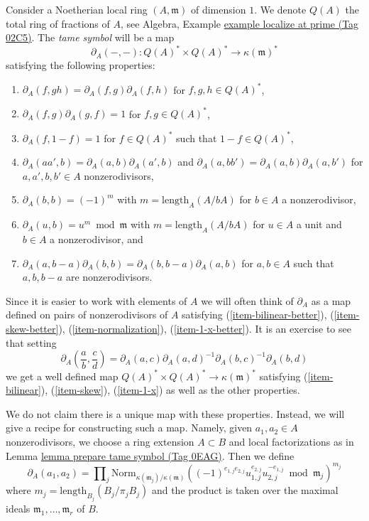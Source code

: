 \documentclass{amsart}
\theoremstyle{plain}
\theoremstyle{definition}
\theoremstyle{remark}
\numberwithin{equation}{subsection}
\begin{document}
\noindent
Consider a Noetherian local ring $(A, \mathfrak m)$ of dimension $1$.
We denote $Q(A)$ the total ring of fractions of $A$, see
Algebra, Example \href{https://stacks.math.columbia.edu/tag/02C5}{example localize at prime (Tag 02C5)}.
The {\it tame symbol} will be a map
$$
\partial_A(-, -) : Q(A)^* \times Q(A)^* \longrightarrow \kappa(\mathfrak m)^*
$$
satisfying the following properties:
\begin{enumerate}
\item $\partial_A(f, gh) = \partial_A(f, g) \partial_A(f, h)$
\label{item-bilinear}
for $f, g, h \in Q(A)^*$,
\item $\partial_A(f, g) \partial_A(g, f) = 1$
\label{item-skew}
for $f, g \in Q(A)^*$,
\item $\partial_A(f, 1 - f) = 1$
\label{item-1-x}
for $f \in Q(A)^*$ such that $1 - f \in Q(A)^*$,
\item $\partial_A(aa', b) = \partial_A(a, b)\partial_A(a', b)$
\label{item-bilinear-better}
and $\partial_A(a, bb') = \partial_A(a, b)\partial_A(a, b')$
for $a, a', b, b' \in A$ nonzerodivisors,
\item $\partial_A(b, b) = (-1)^m$
\label{item-skew-better}
with $m = \text{length}_A(A/bA)$
for $b \in A$ a nonzerodivisor,
\item $\partial_A(u, b) = u^m \bmod \mathfrak m$
\label{item-normalization}
with $m = \text{length}_A(A/bA)$ for $u \in A$ a unit and
$b \in A$ a nonzerodivisor, and
\item
\label{item-1-x-better}
$\partial_A(a, b - a)\partial_A(b, b) = \partial_A(b, b - a)\partial_A(a, b)$
for $a, b \in A$ such that $a, b, b - a$ are nonzerodivisors.
\end{enumerate}
Since it is easier to work with elements of $A$ we will
often think of $\partial_A$ as a map defined on pairs of
nonzerodivisors of $A$ satisfying (\ref{item-bilinear-better}),
(\ref{item-skew-better}), (\ref{item-normalization}),
(\ref{item-1-x-better}). It is an exercise to see that
setting
$$
\partial_A(\frac{a}{b}, \frac{c}{d}) =
\partial_A(a, c) \partial_A(a, d)^{-1} \partial_A(b, c)^{-1} \partial_A(b, d)
$$
we get a well defined map $Q(A)^* \times Q(A)^* \to \kappa(\mathfrak m)^*$
satisfying (\ref{item-bilinear}), (\ref{item-skew}), (\ref{item-1-x})
as well as the other properties.

\medskip\noindent
We do not claim there is a unique map with these properties.
Instead, we will give a recipe for constructing such a map.
Namely, given $a_1, a_2 \in A$ nonzerodivisors, we choose
a ring extension $A \subset B$ and local factorizations
as in Lemma \href{https://stacks.math.columbia.edu/tag/0EAG}{lemma prepare tame symbol (Tag 0EAG)}.
Then we define
\begin{equation}
\label{equation-tame-symbol}
\partial_A(a_1, a_2) = \prod\nolimits_j
\text{Norm}_{\kappa(\mathfrak m_j)/\kappa(\mathfrak m)}
((-1)^{e_{1, j}e_{2, j}}u_{1, j}^{e_{2, j}}u_{2, j}^{-e_{1, j}}
\bmod \mathfrak m_j)^{m_j}
\end{equation}
where $m_j = \text{length}_{B_j}(B_j/\pi_j B_j)$ and the product
is taken over the maximal ideals $\mathfrak m_1, \ldots, \mathfrak m_r$ of $B$.
\end{document}
